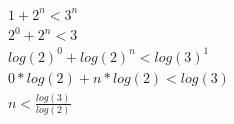 \begin{question}
		\begin{equation}
	  \begin{split}
	  		1 + 2^{n} < 3^{n} \\
			2^{0} + 2^{n} < 3 \\
			log(2)^{0} + log(2)^{n} < log(3)^{1} \\
			0*log(2) + n*log(2) < log(3) \\
			n < \frac{log(3)}{log(2)} \\
		\end{split}
	\end{equation}
\end{question}
\newpage